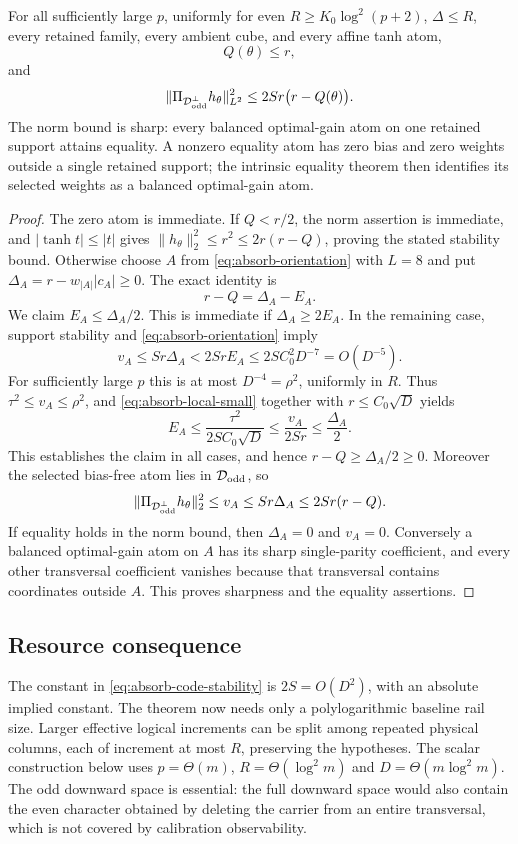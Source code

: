\begin{theorem}
\label{thm:absorb-code}
For all sufficiently large $p$, uniformly for even $R\geq K_0\log^2(p+2)$,
$\Delta\leq R$, every retained family, every ambient cube, and every affine
tanh atom,
\begin{equation}\label{eq:absorb-code-norm}
 Q(\theta)\leq r,
\end{equation}
and
\begin{equation}\label{eq:absorb-code-stability}
 \|\Pi_{\mathcal D_{\rm odd}^{\perp}}h_\theta\|_{L^2}^2
 \leq 2S r\bigl(r-Q(\theta)\bigr).
\end{equation}
The norm bound is sharp: every balanced optimal-gain atom on one retained
support attains equality.  A nonzero equality atom has zero bias and zero
weights outside a single retained support; the intrinsic equality theorem
then identifies its selected weights as a balanced optimal-gain atom.
\end{theorem}
\begin{proof}
The zero atom is immediate.  If $Q<r/2$, the norm assertion is immediate,
and $|\tanh t|\leq|t|$ gives
$\|h_\theta\|_2^2\leq r^2\leq2r(r-Q)$, proving the stated stability bound.
Otherwise choose $A$ from \eqref{eq:absorb-orientation} with $L=8$ and put
$\Delta_A=r-w_{|A|}|c_A|\geq0$.  The exact identity is
\[
 r-Q=\Delta_A-E_A.
\]
We claim $E_A\leq\Delta_A/2$.  This is immediate if
$\Delta_A\geq2E_A$.  In the remaining case, support stability and
\eqref{eq:absorb-orientation} imply
\[
 v_A\leq S r\Delta_A<2S rE_A
 \leq2S C_0^2 D^{-7}=O(D^{-5}).
\]
For sufficiently large $p$ this is at most $D^{-4}=\rho^2$,
uniformly in $R$.  Thus $\tau^2\leq v_A\leq\rho^2$, and
\eqref{eq:absorb-local-small} together with $r\leq C_0\sqrt D$ yields
\[
 E_A\leq\frac{\tau^2}{2S C_0\sqrt D}
 \leq\frac{v_A}{2Sr}\leq\frac{\Delta_A}{2}.
\]
This establishes the claim in all cases, and hence
$r-Q\geq\Delta_A/2\geq0$.  Moreover the selected bias-free atom lies in
$\mathcal D_{\rm odd}$, so
\[
 \|\Pi_{\mathcal D_{\rm odd}^{\perp}}h_\theta\|_2^2
 \leq v_A\leq S r\Delta_A\leq2S r(r-Q).
\]
If equality holds in the norm bound, then $\Delta_A=0$ and $v_A=0$.
Conversely a balanced optimal-gain atom on $A$ has its sharp single-parity
coefficient, and every other transversal coefficient vanishes because that
transversal contains coordinates outside $A$.  This proves sharpness and
the equality assertions.
\end{proof}

\subsection{Resource consequence}
The constant in \eqref{eq:absorb-code-stability} is $2S=O(D^2)$,
with an absolute implied constant. The theorem now needs only a
polylogarithmic baseline rail size. Larger effective logical increments
can be split among repeated physical columns, each of increment at most
$R$, preserving the hypotheses. The scalar construction below uses
$p=\Theta(m)$, $R=\Theta(\log^2m)$ and $D=\Theta(m\log^2m)$.
The odd downward space is essential: the full downward space would
also contain the even character obtained by deleting the carrier from
an entire transversal, which is not covered by calibration observability.
